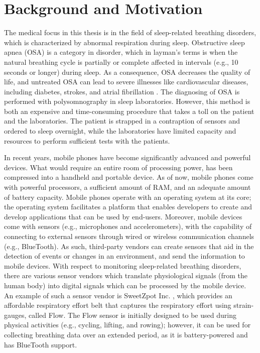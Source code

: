 \section{Background and Motivation}

The medical focus in this thesis is in the field of sleep-related breathing disorders, which is characterized by abnormal respiration during sleep. Obstructive sleep apnea (OSA) is a category in disorder, which in layman's terms is when the natural breathing cycle is partially or complete affected in intervals (e.g., 10 seconds or longer) during sleep. As a consequence, OSA decreases the quality of life, and untreated OSA can lead to severe illnesses like cardiovascular diseases, including diabetes, strokes, and atrial fibrillation \cite{sleep_disorder}. The diagnosing of OSA is performed with polysomnography in sleep laboratories. However, this method is both an expensive and time-consuming procedure that takes a toll on the patient and the laboratories. The patient is strapped in a contraption of sensors and ordered to sleep overnight, while the laboratories have limited capacity and resources to perform sufficient tests with the patients.

In recent years, mobile phones have become significantly advanced and powerful devices. What would require an entire room of processing power, has been compressed into a handheld and portable device. As of now, mobile phones come with powerful processors, a sufficient amount of RAM, and an adequate amount of battery capacity. Mobile phones operate with an operating system at its core; the operating system facilitates a platform that enables developers to create and develop applications that can be used by end-users. Moreover, mobile devices come with sensors (e.g., microphones and accelerometers), with the capability of connecting to external sensors through wired or wireless communication channels (e.g., BlueTooth). As such, third-party vendors can create sensors that aid in the detection of events or changes in an environment, and send the information to mobile devices. With respect to monitoring sleep-related breathing disorders, there are various sensor vendors which translate physiological signals (from the human body) into digital signals which can be processed by the mobile device. An example of such a sensor vendor is SweetZpot Inc. \cite{flow}, which provides an affordable respiratory effort belt that captures the respiratory effort using strain-gauges, called Flow. The Flow sensor is initially designed to be used during physical activities (e.g., cycling, lifting, and rowing); however, it can be used for collecting breathing data over an extended period, as it is battery-powered and has BlueTooth support. 


